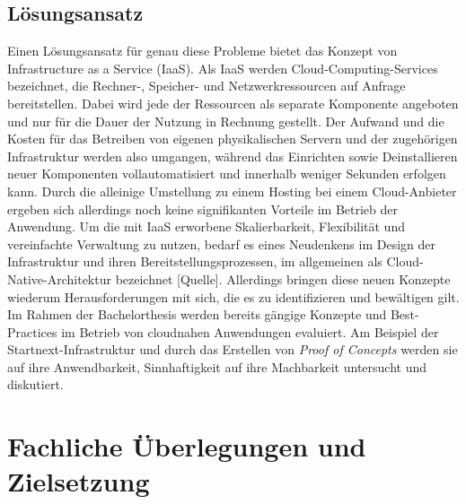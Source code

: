 \documentclass[11pt]{scrartcl}
\begin{document}
\subsection{Lösungsansatz}
Einen Lösungsansatz für genau diese Probleme bietet das Konzept von Infrastructure as a Service (IaaS). Als IaaS werden Cloud-Computing-Services bezeichnet, die Rechner-, Speicher- und Netzwerkressourcen auf Anfrage bereitstellen. Dabei wird jede der Ressourcen als separate Komponente angeboten und nur für die Dauer der Nutzung in Rechnung gestellt. Der Aufwand und die Kosten für das Betreiben von eigenen physikalischen Servern und der zugehörigen Infrastruktur werden also umgangen, während das Einrichten sowie Deinstallieren neuer Komponenten vollautomatisiert und innerhalb weniger Sekunden erfolgen kann.\newline
Durch die alleinige Umstellung zu einem Hosting bei einem Cloud-Anbieter ergeben sich allerdings noch keine signifikanten Vorteile im Betrieb der Anwendung. Um die mit IaaS erworbene Skalierbarkeit, Flexibilität und vereinfachte Verwaltung zu nutzen, bedarf es eines Neudenkens im Design der Infrastruktur und ihren Bereitstellungsprozessen, im allgemeinen als Cloud-Native-Architektur bezeichnet [Quelle]. Allerdings bringen diese neuen Konzepte wiederum Herausforderungen mit sich, die es zu identifizieren und bewältigen gilt. \newline 
Im Rahmen der Bachelorthesis werden bereits gängige Konzepte und \glqq Best-Practices\grqq{} im Betrieb von cloudnahen Anwendungen evaluiert. Am Beispiel der Startnext-Infrastruktur und durch das Erstellen von \textit{Proof of Concepts} werden sie auf ihre Anwendbarkeit, Sinnhaftigkeit auf ihre Machbarkeit untersucht und diskutiert. %


\section{\label{sec:fachliche_ueberlegungen} Fachliche Überlegungen und Zielsetzung}
\end{document}
